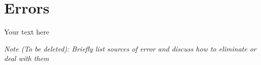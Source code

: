 \documentclass[10pt]{article}
\begin{document}
	
	
	\medskip
	
	
	\section{Errors}
	
	Your text here
	
	\medskip
	
	\textit{Note (To be deleted): Briefly list sources of error and discuss how to eliminate or deal with them}
	
\end{document}
